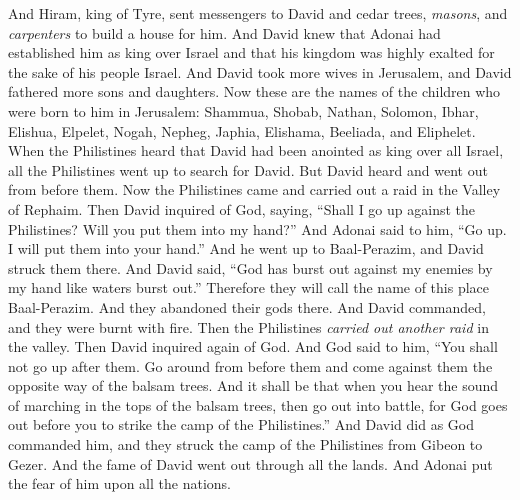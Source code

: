 \begin{biblechapter} %
 And Hiram, king of Tyre, sent messengers to David and cedar trees, \textit{masons}, and \textit{carpenters} to build a house for him.
\verse And David knew that Adonai had established him as king over Israel and that his kingdom was highly exalted for the sake of his people Israel.
\verse And David took more wives in Jerusalem, and David fathered more sons and daughters.
\verse Now these are the names of the children who were born to him in Jerusalem: Shammua, Shobab, Nathan, Solomon,
\verse Ibhar, Elishua, Elpelet,
\verse Nogah, Nepheg, Japhia,
\verse Elishama, Beeliada, and Eliphelet.
 When the Philistines heard that David had been anointed as king over all Israel, all the Philistines went up to search for David. But David heard and went out from before them.
\verse Now the Philistines came and carried out a raid in the Valley of Rephaim.
\verse Then David inquired of God, saying, “Shall I go up against the Philistines? Will you put them into my hand?” And Adonai said to him, “Go up. I will put them into your hand.”
\verse And he went up to Baal-Perazim, and David struck them there. And David said, “God has burst out against my enemies by my hand like waters burst out.” Therefore they will call the name of this place Baal-Perazim.
\verse And they abandoned their gods there. And David commanded, and they were burnt with fire.
\verse Then the Philistines \textit{carried out another raid} in the valley.
\verse Then David inquired again of God. And God said to him, “You shall not go up after them. Go around from before them and come against them the opposite way of the balsam trees.
\verse And it shall be that when you hear the sound of marching in the tops of the balsam trees, then go out into battle, for God goes out before you to strike the camp of the Philistines.”
\verse And David did as God commanded him, and they struck the camp of the Philistines from Gibeon to Gezer.
\verse And the fame of David went out through all the lands. And Adonai put the fear of him upon all the nations.
\end{biblechapter}

